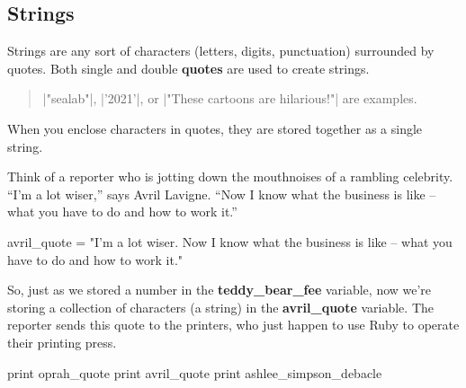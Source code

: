 \documentclass[12pt,twoside]{report}
\begin{document}
\pagebreak
\mbox{}
\vspace*{-52pt}

\subsection{Strings}

Strings are any sort of characters (letters, digits, punctuation)
surrounded by quotes. Both single and double {\bf quotes} are used to
create strings.


\begin{quote}
\rubyinline|"sealab"|,
\rubyinline|'2021'|, or
\rubyinline|"These cartoons are hilarious!"| are
examples.\end{quote}


When you enclose characters in quotes, they are stored together as a
single string.

Think of a reporter who is jotting down the mouthnoises of a rambling
celebrity.  ``I'm a lot wiser,'' says Avril Lavigne.  ``Now I know
what the business is like -- what you have to do and how to work it.''


\begin{rubycode}
	
 avril_quote = "I'm a lot wiser.  Now I know
   what the business is like -- what you have
   to do and how to work it."

\end{rubycode}


So, just as we stored a number in the {\bf teddy\_bear\_fee} variable,
now we're storing a collection of characters (a string) in the {\bf
  avril\_quote} variable.  The reporter sends this quote to the
printers, who just happen to use Ruby to operate their printing press.


\begin{rubycode}
	
 print oprah_quote
 print avril_quote
 print ashlee_simpson_debacle

\end{rubycode}

\ %

\pagebreak
\end{document}
